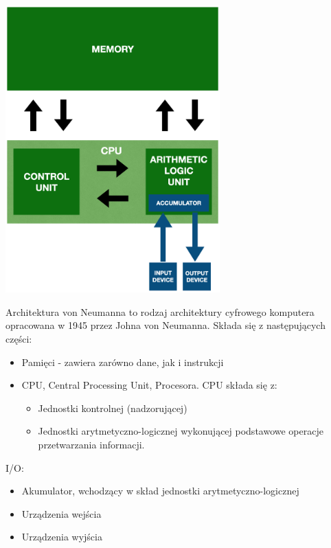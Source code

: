 \documentclass[12pt]{article}
\begin{document}
    \begin{center}
        \includegraphics[width=0.62\textwidth]{graphics/von_neumann.png}
    \end{center}

    Architektura von Neumanna to rodzaj architektury cyfrowego komputera opracowana w 1945 przez Johna von Neumanna.
    Składa się z następujących części:

    \begin{itemize}
    \item Pamięci - zawiera zarówno dane, jak i instrukcji
    \item CPU, Central Processing Unit, Procesora. CPU składa się z:
        \begin{itemize}
            \item Jednostki kontrolnej (nadzorującej)
            \item Jednostki arytmetyczno-logicznej wykonującej podstawowe operacje przetwarzania informacji.
        \end{itemize}
    \end{itemize}

    I/O:
    \begin{itemize}
        \item Akumulator, wchodzący w skład jednostki arytmetyczno-logicznej
        \item Urządzenia wejścia
        \item Urządzenia wyjścia
    \end{itemize}
\end{document}
